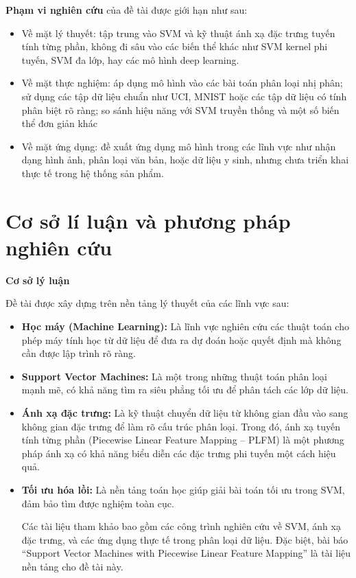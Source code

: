 \textbf{Phạm vi nghiên cứu} của đề tài được giới hạn như sau:
\begin{itemize}
\item Về mặt lý thuyết: tập trung vào SVM và kỹ thuật ánh xạ đặc trưng tuyến tính từng phần, không đi sâu vào các biến thể khác như SVM kernel phi tuyến, SVM đa lớp, hay các mô hình deep learning.

\item Về mặt thực nghiệm: áp dụng mô hình vào các bài toán phân loại nhị phân; sử dụng các tập dữ liệu chuẩn như UCI, MNIST hoặc các tập dữ liệu có tính phân biệt rõ ràng; so sánh hiệu năng với SVM truyền thống và một số biến thể đơn giản khác

\item Về mặt ứng dụng: đề xuất ứng dụng mô hình trong các lĩnh vực như nhận dạng hình ảnh, phân loại văn bản, hoặc dữ liệu y sinh, nhưng chưa triển khai thực tế trong hệ thống sản phẩm.
\end{itemize}

\section*{Cơ sở lí luận và phương pháp nghiên cứu}
\textbf{Cơ sở lý luận}

Đề tài được xây dựng trên nền tảng lý thuyết của các lĩnh vực sau:
\begin{itemize}
\item \textbf{Học máy (Machine Learning):} Là lĩnh vực nghiên cứu các thuật toán cho phép máy tính học từ dữ liệu để đưa ra dự đoán hoặc quyết định mà không cần được lập trình rõ ràng.

\item \textbf{Support Vector Machines:} Là một trong những thuật toán phân loại mạnh mẽ, có khả năng tìm ra siêu phẳng tối ưu để phân tách các lớp dữ liệu.

\item \textbf{Ánh xạ đặc trưng:} Là kỹ thuật chuyển dữ liệu từ không gian đầu vào sang không gian đặc trưng để làm rõ cấu trúc phân loại. Trong đó, ánh xạ tuyến tính từng phần (Piecewise Linear Feature Mapping – PLFM) là một phương pháp ánh xạ có khả năng biểu diễn các đặc trưng phi tuyến một cách hiệu quả.

\item \textbf{Tối ưu hóa lồi:} Là nền tảng toán học giúp giải bài toán tối ưu trong SVM, đảm bảo tìm được nghiệm toàn cục.

Các tài liệu tham khảo bao gồm các công trình nghiên cứu về SVM, ánh xạ đặc trưng, và các ứng dụng thực tế trong phân loại dữ liệu. Đặc biệt, bài báo “Support Vector Machines with Piecewise Linear Feature Mapping” là tài liệu nền tảng cho đề tài này.
\end{itemize}

